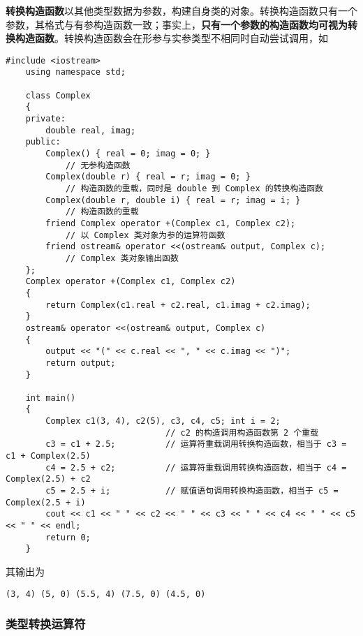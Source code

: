 \documentclass[10pt, a4paper, oneside, fontset=none]{ctexart}
\theoremstyle{plain}
\theoremstyle{definition}
\newcommand{\colors}[1]{\color{#1!75!black}}
\newcommand{\tboba}[1]{\textbf{\kai\color{bali!75!black}#1}}
\begin{document}
\tboba{转换构造函数}以其他类型数据为参数，构建自身类的对象。转换构造函数只有一个参数，其格式与有参构造函数一致；事实上，\textbf{只有一个参数的构造函数均可视为转换构造函数}。转换构造函数会在形参与实参类型不相同时自动尝试调用，如
\label{sec. 转换构造函数} 
\begin{lstlisting}[moreemph={Complex, ostream}, emphstyle=\colors{qinglv}, moreemph={[2]{output, real, imag, c, r, i, c1, c2, c3, c4, c5}}, emphstyle={[2]\it\ttfamily},]
	#include <iostream>
	using namespace std;

	class Complex
	{
	private:
		double real, imag;
	public:
		Complex() { real = 0; imag = 0; }
			// 无参构造函数
		Complex(double r) { real = r; imag = 0; }
			// 构造函数的重载，同时是 double 到 Complex 的转换构造函数
		Complex(double r, double i) { real = r; imag = i; }
			// 构造函数的重载
		friend Complex operator +(Complex c1, Complex c2);
			// 以 Complex 类对象为参的运算符函数
		friend ostream& operator <<(ostream& output, Complex c);
			// Complex 类对象输出函数
	};
	Complex operator +(Complex c1, Complex c2)
	{
		return Complex(c1.real + c2.real, c1.imag + c2.imag);
	}
	ostream& operator <<(ostream& output, Complex c)
	{
		output << "(" << c.real << ", " << c.imag << ")";
		return output;
	}
			
	int main()
	{
		Complex c1(3, 4), c2(5), c3, c4, c5; int i = 2;
								// c2 的构造调用构造函数第 2 个重载
		c3 = c1 + 2.5;			// 运算符重载调用转换构造函数，相当于 c3 = c1 + Complex(2.5)
		c4 = 2.5 + c2;			// 运算符重载调用转换构造函数，相当于 c4 = Complex(2.5) + c2
		c5 = 2.5 + i;			// 赋值语句调用转换构造函数，相当于 c5 = Complex(2.5 + i)
		cout << c1 << " " << c2 << " " << c3 << " " << c4 << " " << c5 << " " << endl;
		return 0;
	}
\end{lstlisting}
其输出为
\begin{lstlisting}[style=output]
	(3, 4) (5, 0) (5.5, 4) (7.5, 0) (4.5, 0)
\end{lstlisting}

\subsubsection{类型转换运算符}
\end{document}
